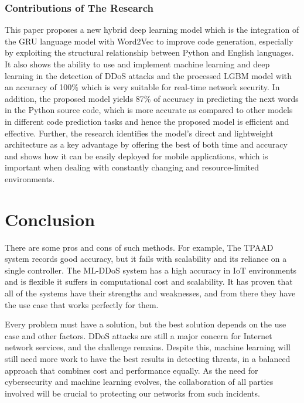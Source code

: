 \documentclass[a4paper, 12pt]{article}
\begin{document}
\subsubsection{Contributions of The Research}
This paper proposes a new hybrid deep learning model which is the integration of the GRU language model with Word2Vec to improve code generation, especially by exploiting the structural relationship between Python and English languages. It also shows the ability to use and implement machine learning and deep learning in the detection of DDoS attacks and the processed LGBM model with an accuracy of 100\% which is very suitable for real-time network security. In addition, the proposed model yields 87\% of accuracy in predicting the next words in the Python source code, which is more accurate as compared to other models in different code prediction tasks and hence the proposed model is efficient and effective. Further, the research identifies the model’s direct and lightweight architecture as a key advantage by offering the best of both time and accuracy and shows how it can be easily deployed for mobile applications, which is important when dealing with constantly changing and resource-limited environments.

\clearpage

\section{Conclusion}

There are some pros and cons of such methods. For example, The TPAAD system records good accuracy, but it fails with scalability and its reliance on a single controller.  The ML-DDoS system has a high accuracy in IoT environments and is flexible it suffers in computational cost and scalability. \cite{4} It has proven that all of the systems have their strengths and weaknesses, and from there they have the use case that works perfectly for them. 

Every problem must have a solution, but the best solution depends on the use case and other factors. DDoS attacks are still a major concern for Internet network services, and the challenge remains. Despite this, machine learning will still need more work to have the best results in detecting threats, in a balanced approach that combines cost and performance equally. As the need for cybersecurity and machine learning evolves, the collaboration of all parties involved will be crucial to protecting our networks from such incidents. 
\end{document}

